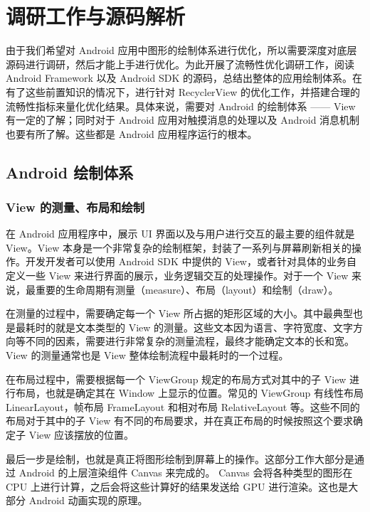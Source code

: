 \chapter{调研工作与源码解析}

由于我们希望对 Android 应用中图形的绘制体系进行优化，所以需要深度对底层源码进行调研，然后才能上手进行优化。为此开展了流畅性优化调研工作，阅读 Android Framework 以及 Android SDK 的源码，总结出整体的应用绘制体系。在有了这些前置知识的情况下，进行针对 RecyclerView 的优化工作，并搭建合理的流畅性指标来量化优化结果。具体来说，需要对 Android 的绘制体系 —— View 有一定的了解；同时对于 Android 应用对触摸消息的处理以及 Android 消息机制也要有所了解。这些都是 Android 应用程序运行的根本。

\section{Android 绘制体系}

\subsection{View 的测量、布局和绘制}

在 Android 应用程序中，展示 UI 界面以及与用户进行交互的最主要的组件就是 View。View 本身是一个非常复杂的绘制框架，封装了一系列与屏幕刷新相关的操作。开发开发者可以使用 Android SDK 中提供的 View，或者针对具体的业务自定义一些 View 来进行界面的展示，业务逻辑交互的处理操作。对于一个 View 来说，最重要的生命周期有测量（measure）、布局（layout）和绘制（draw）\cite{rountev2014static}。

在测量的过程中，需要确定每一个 View 所占据的矩形区域的大小。其中最典型也是最耗时的就是文本类型的 View 的测量。这些文本因为语言、字符宽度、文字方向等不同的因素，需要进行非常复杂的测量流程，最终才能确定文本的长和宽。View 的测量通常也是 View 整体绘制流程中最耗时的一个过程。

在布局过程中，需要根据每一个 ViewGroup 规定的布局方式对其中的子 View 进行布局，也就是确定其在 Window 上显示的位置。常见的 ViewGroup 有线性布局 LinearLayout，帧布局 FrameLayout 和相对布局 RelativeLayout 等。这些不同的布局对于其中的子 View 有不同的布局要求，并在真正布局的时候按照这个要求确定子 View 应该摆放的位置。

最后一步是绘制，也就是真正将图形绘制到屏幕上的操作。这部分工作大部分是通过 Android 的上层渲染组件 Canvas 来完成的。 Canvas 会将各种类型的图形在 CPU 上进行计算，之后会将这些计算好的结果发送给 GPU 进行渲染。这也是大部分 Android 动画实现的原理。

